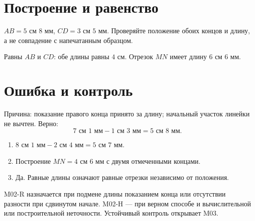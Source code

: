 \section{Построение и равенство}

\constructionalgorithmfigure
\studentconstructionanswersfigure

\begin{teacherbox}
  $AB=5\text{ см }8\text{ мм}$, $CD=3\text{ см }5\text{ мм}$. Проверяйте
  положение обоих концов и длину, а не совпадение с напечатанным образцом.
\end{teacherbox}

\equalcontrastingsegmentsfigure

\begin{practicebox}
  Равны $AB$ и $CD$: обе длины равны $4\text{ см}$. Отрезок $MN$
  имеет длину $6\text{ см }6\text{ мм}$.
\end{practicebox}

\section{Ошибка и контроль}

\begin{warningbox}[Исправление]
  Причина: показание правого конца принято за длину; начальный участок линейки
  не вычтен. Верно:
  \[
    7\text{ см }1\text{ мм}-1\text{ см }3\text{ мм}
      =5\text{ см }8\text{ мм}.
  \]
\end{warningbox}

\begin{checkpointbox}[Ответы]
  \begin{enumerate}[label=\textbf{\arabic*.}]
    \item $8\text{ см }1\text{ мм}-2\text{ см }4\text{ мм}
      =5\text{ см }7\text{ мм}$.
    \item Построение $MN=4\text{ см }6\text{ мм}$ с двумя отмеченными
      концами.
    \item Да. Равные длины означают равные отрезки независимо от положения.
  \end{enumerate}
\end{checkpointbox}

\begin{teacherbox}
  M02-R назначается при подмене длины показанием конца или отсутствии разности
  при сдвинутом начале. M02-H — при верном способе и вычислительной или
  построительной неточности. Устойчивый контроль открывает M03.
\end{teacherbox}
